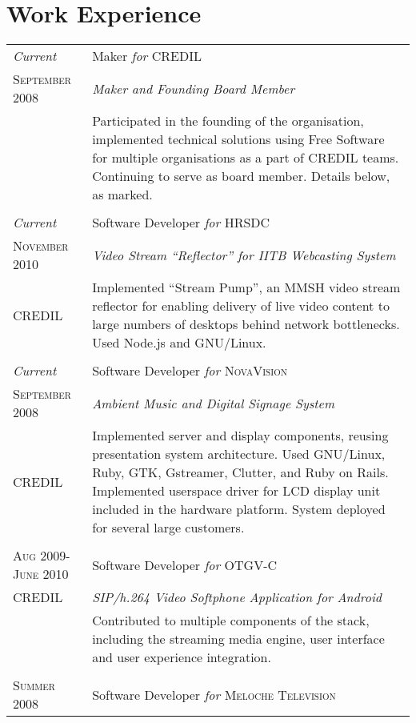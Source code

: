 \documentclass[letterpaper,10pt]{article}
\begin{document}
\section{Work Experience}
\begin{longtable}{p{3cm}|p{12cm}}
  \emph{Current} & Maker \emph{for} \textsc{CREDIL} \\
  \textsc{September 2008} & \emph{Maker and Founding Board Member} \\
   & \footnotesize{Participated in the founding of the organisation, implemented technical solutions using Free Software for multiple organisations as a part of CREDIL teams.  Continuing to serve as board member.  Details below, as marked.} \\
  \multicolumn{2}{c}{} \\
  \emph{Current} & Software Developer \emph{for} \textsc{HRSDC} \\
  \textsc{November 2010} & \emph{Video Stream ``Reflector'' for IITB Webcasting System} \\
  \tiny{CREDIL} & \footnotesize{Implemented ``Stream Pump'', an MMSH video stream reflector for enabling delivery of live video content to large numbers of desktops behind network bottlenecks.  Used Node.js and GNU/Linux.} \\
  \multicolumn{2}{c}{} \\
  \emph{Current} & Software Developer \emph{for} \textsc{NovaVision} \\
  \textsc{September 2008} & \emph{Ambient Music and Digital Signage System} \\
  \tiny{CREDIL} & \footnotesize{Implemented server and display components, reusing presentation system architecture.  Used GNU/Linux, Ruby, GTK, Gstreamer, Clutter, and Ruby on Rails.  Implemented userspace driver for LCD display unit included in the hardware platform. System deployed for several large customers.} \\
  \pagebreak
  \multicolumn{2}{c}{} \\
  \textsc{Aug 2009-June 2010} & Software Developer \emph{for} OTGV-C \\
  \tiny{CREDIL} & \emph{SIP/h.264 Video Softphone Application for Android} \\
  & \footnotesize{Contributed to multiple components of the stack, including the streaming media engine, user interface and user experience integration.} \\
  \multicolumn{2}{c}{} \\
  \textsc{Summer 2008} & Software Developer \emph{for} \textsc{Meloche Television} \\

\end{longtable}
\end{document}
